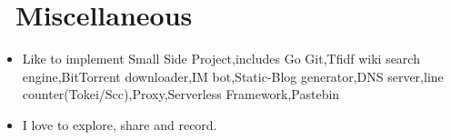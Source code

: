 \documentclass{resume}
\newcommand{\en}[1]{#1}
\newcommand{\zh}[1]{}
\begin{document}
\section{\faInfo\ \en{Miscellaneous}\zh{杂项}}
\begin{itemize}[parsep=0.5ex]
      \item \en{Like to implement Small Side Project,includes Go Git,Tfidf wiki search engine,BitTorrent downloader,IM bot,Static-Blog generator,DNS server,line counter(Tokei/Scc),Proxy,Serverless Framework,Pastebin}
            \zh{喜欢实现 Small Side Project,包括 Go Git、Tfidf wiki 搜索引擎、BitTorrent downloader、IM bot、Static-Blog generator、line counter(Tokei/Scc)、Proxy、Serverless Framework、Pastebin 等等}
      \item \en{I love to explore, share and record.}
            \zh{喜欢折腾和探索,热爱分享和记录}
\end{itemize}
\end{document}
